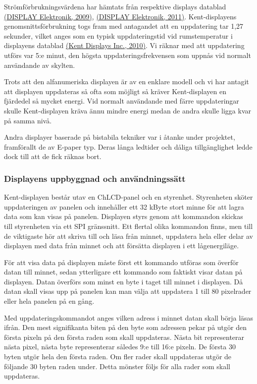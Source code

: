 \documentclass[a4paper,11pt]{article}
\begin{document}
Strömförbrukningsvärdena har hämtats från respektive displays datablad \hyperref[lcdalfa]{(DISPLAY Elektronik, 2009)}, \hyperref[lcdgraph]{(DISPLAY Elektronik, 2011)}. Kent-displayens genomsnittsförbrukning togs fram med antagandet att en uppdatering tar 1,27 sekunder, vilket anges som en typisk uppdateringstid vid rumstemperatur i displayens datablad \hyperref[kent]{(Kent Displays Inc., 2010)}. Vi räknar med att uppdatering utförs var 5:e minut, den högsta uppdateringsfrekvensen som uppnås vid normalt användande av skylten.

Trots att den alfanumeriska displayen är av en enklare modell och vi har antagit att displayen uppdateras så ofta som möjligt så kräver Kent-displayen en fjärdedel så mycket energi. Vid normalt användande med färre uppdateringar skulle Kent-displayen kräva ännu mindre energi medan de andra skulle ligga kvar på samma nivå.

Andra displayer baserade på bistabila tekniker var i åtanke under projektet, framförallt de av E-paper typ. Deras långa ledtider och dåliga tillgänglighet ledde dock till att de fick räknas bort.

\subsubsection{Displayens uppbyggnad och användningssätt}
Kent-displayen består utav en ChLCD-panel och en styrenhet. Styrenheten sköter uppdateringen av panelen och innehåller ett 32 kByte stort minne för att lagra data som kan visas på panelen. Displayen styrs genom att kommandon skickas till styrenheten via ett SPI gränssnitt. Ett flertal olika kommandon finns, men till de viktigaste hör att skriva till och läsa från minnet, uppdatera hela eller delar av displayen med data från minnet och att försätta displayen i ett lågenergiläge.

För att visa data på displayen måste först ett kommando utföras som överför datan till minnet, sedan ytterligare ett kommando som faktiskt visar datan på displayen. Datan överförs som minst en byte i taget till minnet i displayen. Då datan skall visas upp på panelen kan man välja att uppdatera 1 till 80 pixelrader eller hela panelen på en gång.

Med uppdateringskommandot anges vilken adress i minnet datan skall börja läsas ifrån. Den mest signifikanta biten på den byte som adressen pekar på utgör den första pixeln på den första raden som skall uppdateras. Nästa bit representerar nästa pixel, nästa byte representerar således 9:e till 16:e pixeln. De första 30 byten utgör hela den första raden. Om fler rader skall uppdateras utgör de följande 30 byten raden under. Detta mönster följs för alla rader som skall uppdateras.
\end{document}
